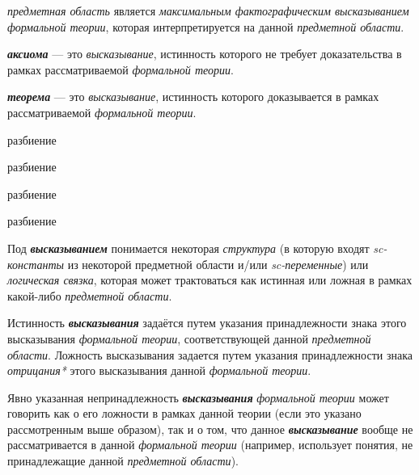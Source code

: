 \textit{предметная область} является \textit{максимальным фактографическим высказыванием} \textit{формальной теории}, которая интерпретируется на данной \textit{предметной области}.

\textbf{\textit{аксиома}} --- это \textit{высказывание}, истинность которого не требует доказательства в рамках рассматриваемой \textit{формальной теории}.

\textbf{\textit{теорема}} --- это \textit{высказывание}, истинность которого доказывается в рамках рассматриваемой \textit{формальной теории}.

\begin{SCn}
\begin{scnrelfromset}{разбиение}
\end{scnrelfromset}
\begin{scnrelfromset}{разбиение}
\end{scnrelfromset}
\end{SCn}
\begin{SCn}
\begin{scnrelfromset}{разбиение}
\end{scnrelfromset}
\begin{scnrelfromset}{разбиение}
\end{scnrelfromset}
\end{SCn}

Под \textbf{\textit{высказыванием}} понимается некоторая \textit{структура} (в которую входят \textit{sc-константы} из некоторой предметной области и/или \textit{sc-переменные}) или \textit{логическая связка}, которая может трактоваться как истинная или ложная в рамках какой-либо \textit{предметной области}.

Истинность \textbf{\textit{высказывания}} задаётся путем указания принадлежности знака этого высказывания \textit{формальной теории}, соответствующей данной \textit{предметной области}. Ложность высказывания задается путем указания принадлежности знака \textit{отрицания*} этого высказывания данной \textit{формальной теории}.

Явно указанная непринадлежность \textbf{\textit{высказывания}} \textit{формальной теории} может говорить как о его ложности в рамках данной теории (если это указано рассмотренным выше образом), так и о том, что данное  \textbf{\textit{высказывание}} вообще не рассматривается в данной \textit{формальной теории} (например, использует понятия, не принадлежащие данной \textit{предметной области}).

